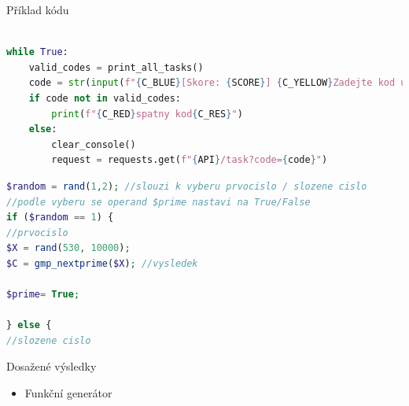 \documentclass[aspectratio=1610]{beamer}
\begin{document}
\begin{frame}[fragile]{Příklad kódu}

\begin{lstlisting}[language=python,title={Příklad Python kódu}]

while True:
    valid_codes = print_all_tasks()
    code = str(input(f"{C_BLUE}[Skore: {SCORE}] {C_YELLOW}Zadejte kod ulohy, kterou si prejete resit:{C_RES}"))
    if code not in valid_codes:
        print(f"{C_RED}spatny kod{C_RES}")
    else:    
        clear_console()
        request = requests.get(f"{API}/task?code={code}")
\end{lstlisting}
    \vfill

\begin{lstlisting}[language=php,title={Příklad PHP kódu}]
$random = rand(1,2); //slouzi k vyberu prvocislo / slozene cislo
//podle vyberu se operand $prime nastavi na True/False
if ($random == 1) {
//prvocislo
$X = rand(530, 10000);
$C = gmp_nextprime($X); //vysledek

$prime= True;

} else {
//slozene cislo
\end{lstlisting}


\end{frame}

\begin{frame}{Dosažené výsledky}
    \begin{itemize}
        \item Funkční generátor
    \end{itemize}
\end{frame}


\end{document}
